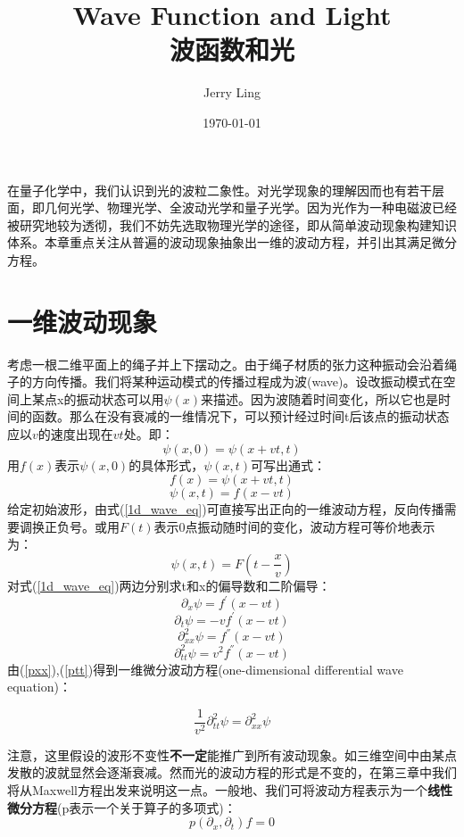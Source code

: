 \documentclass[12pt]{ctexart}%
\title{Wave Function and Light\\波函数和光}
\author{Jerry Ling}
\date{\today}
\begin{document}
\maketitle  %
在量子化学中，我们认识到光的波粒二象性。对光学现象的理解因而也有若干层面，即几何光学、物理光学、全波动光学和量子光学。因为光作为一种电磁波已经被研究地较为透彻，我们不妨先选取物理光学的途径，即从简单波动现象构建知识体系。本章重点关注从普遍的波动现象抽象出一维的波动方程，并引出其满足微分方程。

\section*{一维波动现象}
考虑一根二维平面上的绳子并上下摆动之。由于绳子材质的张力这种振动会沿着绳子的方向传播。我们将某种运动模式的传播过程成为波(wave)。设改振动模式在空间上某点x的振动状态可以用$\psi(x)$来描述。因为波随着时间变化，所以它也是时间的函数。那么在没有衰减的一维情况下，可以预计经过时间t后该点的振动状态应以$v$的速度出现在$vt$处。即：
\begin{equation}
    \psi(x,0)=\psi(x+vt,t)
\end{equation}
用$f(x)$表示$\psi(x,0)$的具体形式，$\psi(x,t)$可写出通式：
\begin{equation*}
    f(x)=\psi(x+vt,t)
\end{equation*}
\begin{equation}
    \psi(x,t)=f(x-vt)\label{1d_wave_eq}
\end{equation}
给定初始波形，由式(\ref{1d_wave_eq})可直接写出正向的一维波动方程，反向传播需要调换正负号。或用$F(t)$表示0点振动随时间的变化，波动方程可等价地表示为：
\begin{equation}
    \psi(x,t)=F(t-\frac{x}{v})\label{1d_wave_eq2}
\end{equation}
对式(\ref{1d_wave_eq})两边分别求t和x的偏导数和二阶偏导：
\begin{equation}
    \partial_{x} \psi=f^{'}(x-vt)
\end{equation}
\begin{equation}
    \partial_{t}\psi=-v f^{'}(x-vt)
\end{equation}
\begin{equation}
    \partial^2_{xx}\psi=f^{''}(x-vt)\label{pxx}
\end{equation}
\begin{equation}
    \partial^2_{tt}\psi=v^2f^{''}(x-vt)\label{ptt}
\end{equation}
由(\ref{pxx}),(\ref{ptt})得到一维微分波动方程(one-dimensional differential wave equation)：
\begin{framed}
    \begin{equation}   
        \frac{1}{v^2}\partial^2_{tt}\psi=\partial^2_{xx}\psi 
        \label{we1}
    \end{equation}
\end{framed}
注意，这里假设的波形不变性\textbf{不一定}能推广到所有波动现象。如三维空间中由某点发散的波就显然会逐渐衰减。然而光的波动方程的形式是不变的，在第三章中我们将从Maxwell方程出发来说明这一点。一般地、我们可将波动方程表示为一个\textbf{线性微分方程}(p表示一个关于算子的多项式)：
\begin{equation}
    p(\partial_x,\partial_t)f=0
    \label{lpde}
\end{equation}
\end{document}

